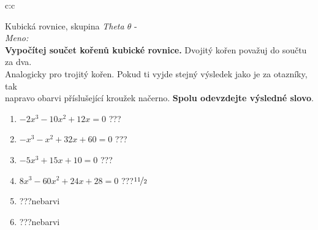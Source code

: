 \documentclass[10pt]{report}
\begin{document}
\clearpage
\thispagestyle{empty}
\begin{tabular}{c:c}
\begin{minipage}[c][99mm][t]{0.49\linewidth}
\begin{center}
\vspace{7mm}
{\huge Kubická rovnice, skupina \textit{Theta $\theta$} -}\\[4.5mm]
\textit{Meno:}\phantom{xxxxxxxxxxxxxxxxxxxxxxxxxxxxxxxxxxxxxxxxxxxxxxxxxxxxxxxxxxxxxxxxx}\\[3.5mm]
\textbf{Vypočítej součet kořenů kubické rovnice.} Dvojitý kořen považuj do součtu za dva.\\Analogicky pro trojitý kořen. Pokud ti vyjde stejný výsledek jako je za otazníky, tak\\napravo obarvi příslušející kroužek načerno. \textbf{Spolu odevzdejte výsledné slovo}.\\[3mm]
\begin{minipage}{0.77\linewidth}
\begin{center}
\begin{varwidth}{\textwidth}
\begin{enumerate}
\large
\item $-2x^3-10x^2+12x=0$\quad \dotfill\; ???\;\dotfill {}
\item $-x^3-x^2+32x+60=0$\quad \dotfill\; ???\;\dotfill {}
\item $-5x^3+15x+10=0$\quad \dotfill\; ???\;\dotfill {}
\item $8x^3-60x^2+24x+28=0$\quad \dotfill\; ???\;\dotfill \quad $\nicefrac{11}{2}$
\item \quad \dotfill\; ???\;\dotfill \quad nebarvi
\item \quad \dotfill\; ???\;\dotfill \quad nebarvi
\end{enumerate}
\end{varwidth}
\end{center}
\end{minipage}
\begin{minipage}{0.20\linewidth}
\begin{center}

\end{center}
\end{minipage}
\end{center}
\end{minipage}
\end{tabular}
\end{document}
